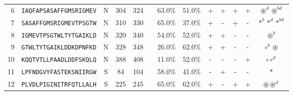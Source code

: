 \begin{tabular}{rcccccccccccc}
6  &  \texttt{IAQFAPSASAFFGMSRIGMEV} &       N &    304 &   324 &                                                                  &                          63.0\% &                           51.0\% &          + &           + &          + &           + &                                                                                                 $ \circledast^d \circledast^{bd} $ \\
7  &  \texttt{SASAFFGMSRIGMEVTPSGTW} &       N &    310 &   330 &                                                                  &                          65.0\% &                           37.0\% &          + &           - &          + &           - &                                                                                                        $ \ast^b \ast^d \ast^{bd} $ \\
8  &  \texttt{IGMEVTPSGTWLTYTGAIKLD} &       N &    320 &   340 &                                                                  &                          54.0\% &                           52.0\% &          + &           + &          - &           - &                                                                                                                  $ \circledast^b $ \\
9  &  \texttt{GTWLTYTGAIKLDDKDPNFKD} &       N &    328 &   348 &                                                                  &                          26.0\% &                           62.0\% &          + &           + &          - &           - &                                                                                                            $ \circ^b \circledast $ \\
10 &  \texttt{KQQTVTLLPAADLDDFSKQLQ} &       N &    388 &   408 &                                                                  &                          11.0\% &                           52.0\% &          - &           - &          - &           + &                                                                                                                  $ \circ \circ^d $ \\
11 &  \texttt{LPFNDGVYFASTEKSNIIRGW} &       S &     84 &   104 &                                                                  &                          58.0\% &                           41.0\% &          - &           + &          - &           - &                                                                                                                           $ \ast $ \\
12 &  \texttt{PLVDLPIGINITRFQTLLALH} &       S &    225 &   245 &                                                                  &                          65.0\% &                           62.0\% &          + &           - &          + &           + &                                                                                                      $ \circledast \circledast^d $ \\

\end{tabular}
